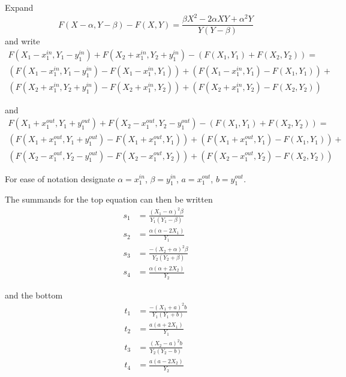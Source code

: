 \documentclass{article}
\theoremstyle{case}
\begin{document}
Expand 
\[
F(X - \alpha, Y - \beta) - F(X, Y) = \frac{\beta X^2 - 2\alpha XY + \alpha^2 Y}{Y\left( Y-\beta\right)}
\]
and write
\begin{align*}
F(X_1 - x_1^{in}, Y_1 - y_1^{in}) + F(X_2 + x_1^{in}, Y_2 + y_1^{in}) - \left( F(X_1, Y_1) + F(X_2, Y_2)\right) = \\
\left( F(X_1 - x_1^{in}, Y_1 - y_1^{in}) - F(X_1 - x_1^{in}, Y_1)\right) + \left( F(X_1 - x_1^{in}, Y_1) - F(X_1 , Y_1)\right) + \\
\left( F(X_2 + x_1^{in}, Y_2 + y_1^{in}) - F(X_2 + x_1^{in}, Y_2)\right) + \left( F(X_2 + x_1^{in}, Y_2) - F(X_2, Y_2)\right)
\end{align*}

and
\begin{align*}
F(X_1 + x_1^{out}, Y_1 + y_1^{out}) + F(X_2 - x_1^{out}, Y_2 - y_1^{out}) - \left( F(X_1, Y_1) + F(X_2, Y_2)\right) = \\
\left( F(X_1 + x_1^{out}, Y_1 + y_1^{out}) - F(X_1 + x_1^{out}, Y_1)\right) + \left( F(X_1 + x_1^{out}, Y_1) - F(X_1 , Y_1)\right) + \\
\left( F(X_2 - x_1^{out}, Y_2 - y_1^{out}) - F(X_2 - x_1^{out}, Y_2)\right) + \left( F(X_2 - x_1^{out}, Y_2) - F(X_2, Y_2)\right)
\end{align*}

For ease of notation designate $\alpha = x_1^{in}$, $\beta = y_1^{in}$, $a = x_1^{out}$, $b = y_1^{out}$.

The summands for the top equation can then be written
\begin{align*}
s_1 & = \frac{\left(X_1 - \alpha\right)^2\beta}{Y_1\left( Y_1 - \beta\right)} \\
s_2 & = \frac{\alpha \left( \alpha - 2X_1\right)}{Y_1} \\
s_3 & = \frac{-\left( X_2 + \alpha\right)^2\beta}{Y_2\left( Y_2 + \beta\right)} \\
s_4 & = \frac{\alpha\left( \alpha + 2X_2\right)}{Y_2}
\end{align*}

and the bottom
\begin{align*}
t_1 & = \frac{-\left( X_1 + a\right)^2 b}{Y_1\left( Y_1 + b\right)} \\
t_2 & = \frac{a\left( a + 2X_1\right)}{Y_1} \\
t_3 & = \frac{\left( X_2 - a\right)^2b}{Y_2\left( Y_2 - b\right)} \\
t_4 & = \frac{a\left( a - 2X_2\right)}{Y_2}
\end{align*}
\end{document}
